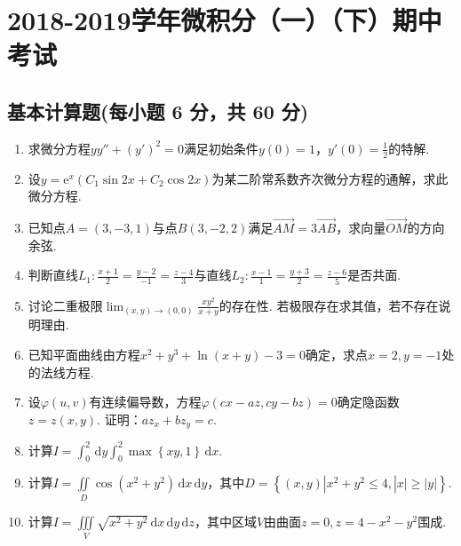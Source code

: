 \documentclass[../Main.tex]{subfiles}
\begin{document}
\chapter{2018-2019学年微积分（一）（下）期中考试}

\section{基本计算题(每小题 6 分，共 60 分)}
\begin{enumerate}
    \item 求微分方程$yy''+(y')^{2} = 0$满足初始条件$y(0)=1$，$y'(0)=\frac{1}{2}$的特解.
          \vspace{12em}

    \item 设$y=\mathrm{e}^{x}\left(C_{1}\sin 2x+C_{2}\cos 2x\right)$为某二阶常系数齐次微分方程的通解，求此微分方程.
          \vspace{12em}

    \item 已知点$A=(3,-3,1)$与点$B(3,-2,2)$满足$\overrightarrow{AM}= 3\overrightarrow
              {AB}$，求向量$\overrightarrow{OM}$的方向余弦.
          \vspace{12em}

    \item 判断直线$L_{1}:\frac{x+1}{2}=\frac{y-2}{-1}=\frac{z-4}{3}$与直线$L_{2}:
              \frac{x-1}{1}=\frac{y+3}{2}=\frac{z-6}{5}$是否共面.
          \vspace{13em}

    \item 讨论二重极限$\lim_{(x,y)\to (0,0)}\frac{x y^{2}}{x+y}$的存在性.
          若极限存在求其值，若不存在说明理由.
          \vspace{13em}

    \item 已知平面曲线由方程$x^{2}+y^{3}+\ln(x+y)-3=0$确定，求点$x=2,y=-1$处的法线方程.
          \vspace{14em}

    \item 设$\varphi(u,v)$有连续偏导数，方程$\varphi(cx-az,cy-bz)=0$确定隐函数$z=
              z(x,y)$. 证明：$az_{x}+bz_{y} = c$.
          \vspace{13em}

    \item 计算$I=\int_{0}^{2}\,\mathrm{d}y\int_{0}^{2}\max\left\{xy,1\right\}\,\mathrm{d}
              x$.
          \vspace{12em}

    \item 计算$I=\iint\limits_{D}\cos\left(x^{2}+y^{2}\right)\,\mathrm{d}x\,\mathrm{d}
              y$，其中$D=\left\{(x,y)|x^{2}+y^{2}\leq 4, |x|\geq |y|\right\}$.
          \vspace{12em}

    \item 计算$I=\iiint\limits_{V}\sqrt{x^{2}+y^{2}}\,\mathrm{d}x\,\mathrm{d}y\,\mathrm{d}
              z$，其中区域$V$由曲面$z=0,z=4-x^{2}-y^{2}$围成.
          \vspace{12em}
\end{enumerate}
\end{document}
